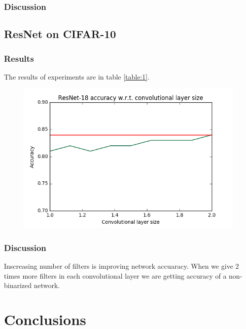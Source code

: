 \documentclass[licencjacka]{pracamgr}
\begin{document}
	\subsection{Discussion}
	\section{ResNet on CIFAR-10}
		\subsection{Results}
		 The results of experiments are in table \ref{table:1}.
		\begin{figure}[h]
				\centering
				\includegraphics[width=\textwidth]{images/filter-ratio}
			\end{figure}
		\subsection{Discussion}
			Inscreasing number of filters is improving network accuaracy. When we give 2 times more filters in each convolutional layer we are getting accuracy of a non-binarized network.

\chapter{Conclusions}
\end{document}
